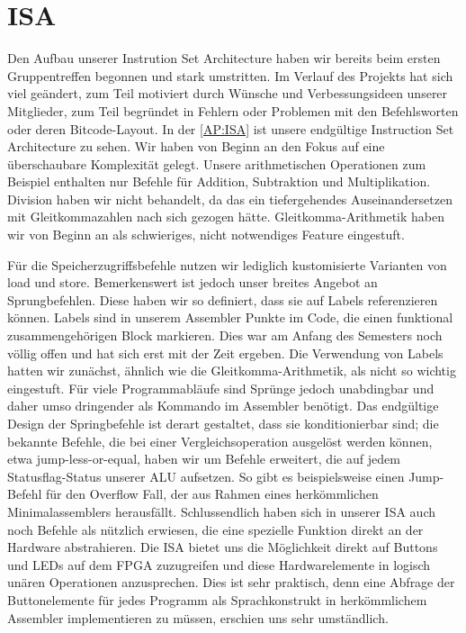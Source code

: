 
\section{ISA} %
Den Aufbau unserer Instrution Set Architecture haben wir bereits beim ersten Gruppentreffen begonnen und stark umstritten. Im Verlauf des Projekts hat sich viel geändert, zum Teil motiviert durch Wünsche und Verbessungsideen unserer Mitglieder, zum Teil begründet in Fehlern oder Problemen mit den Befehlsworten oder deren Bitcode-Layout.
In der \autoref{AP:ISA} ist unsere endgültige Instruction Set Architecture zu sehen. Wir haben von Beginn an den Fokus auf eine überschaubare Komplexität gelegt. Unsere arithmetischen Operationen zum Beispiel enthalten nur Befehle für Addition, Subtraktion und Multiplikation. Division haben wir nicht behandelt, da das ein tiefergehendes Auseinandersetzen mit Gleitkommazahlen nach sich gezogen hätte.  Gleitkomma-Arithmetik haben wir von Beginn an als schwieriges, nicht notwendiges Feature eingestuft. 

Für die Speicherzugriffsbefehle nutzen wir lediglich kustomisierte Varianten von load und store. Bemerkenswert ist jedoch unser breites Angebot an Sprungbefehlen. Diese haben wir so definiert, dass sie auf Labels referenzieren können.  Labels sind in unserem Assembler Punkte im Code, die einen funktional zusammengehörigen Block markieren. Dies war am Anfang des Semesters noch völlig offen und hat sich erst mit der Zeit ergeben. Die Verwendung von Labels hatten wir zunächst, ähnlich wie die Gleitkomma-Arithmetik, als nicht so wichtig eingestuft. Für viele Programmabläufe sind Sprünge jedoch unabdingbar und daher umso dringender als Kommando im Assembler benötigt. Das endgültige Design der Springbefehle ist derart gestaltet, dass sie konditionierbar sind; die bekannte Befehle, die bei einer Vergleichsoperation ausgelöst werden können, etwa jump-less-or-equal, haben wir um Befehle erweitert, die auf jedem Statusflag-Status unserer ALU aufsetzen. So gibt es beispielsweise einen Jump-Befehl für den Overflow Fall, der aus Rahmen eines herkömmlichen Minimalassemblers herausfällt.
Schlussendlich haben sich in unserer ISA auch noch Befehle als nützlich erwiesen, die eine spezielle Funktion direkt an der Hardware abstrahieren. Die ISA bietet uns die Möglichkeit direkt auf Buttons und LEDs auf dem FPGA zuzugreifen und diese Hardwarelemente in logisch unären Operationen anzusprechen. Dies ist sehr praktisch, denn eine Abfrage der Buttonelemente für jedes Programm als Sprachkonstrukt in herkömmlichem Assembler implementieren zu müssen, erschien uns sehr umständlich.

